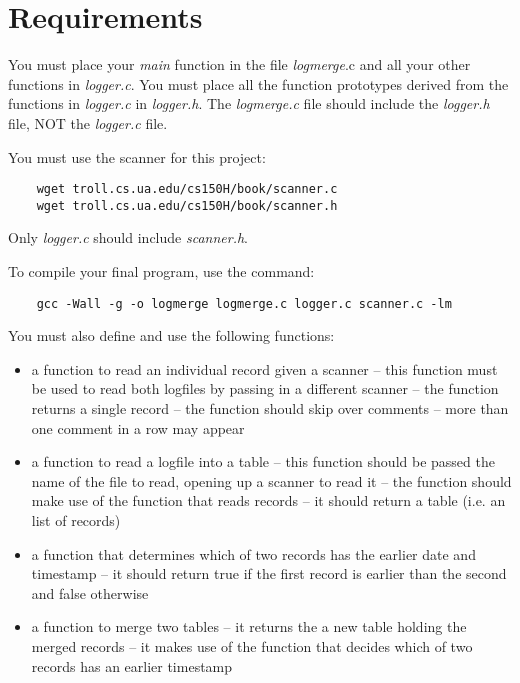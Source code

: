 \documentclass{article}
\begin{document}
\section*{Requirements}

You must place your {\it main} function in the file {\it logmerge}.c
and all your other functions in {\it logger.c}.
You must place all the function
prototypes derived from the functions in {\it logger.c} in {\it logger.h}.
The {\it logmerge.c} file should include the {\it logger.h} file,
NOT the {\it logger.c} file.

You must use the scanner for this project:

\begin{verbatim}
    wget troll.cs.ua.edu/cs150H/book/scanner.c
    wget troll.cs.ua.edu/cs150H/book/scanner.h
\end{verbatim}
    
Only {\it logger.c} should include {\it scanner.h}.

To compile your final program, use the command:

\begin{verbatim}
    gcc -Wall -g -o logmerge logmerge.c logger.c scanner.c -lm
\end{verbatim}

You must also define and use
the following functions:

\begin{itemize}
\item
         a function to read an individual record given a scanner -- this
         function must be used to read both logfiles by passing in
         a different scanner -- the function returns a single record --
         the function should skip over comments -- more than one
         comment in a row may appear

\item
     a function to read a logfile into a table -- this function
     should be passed the name of the file to read, opening up
     a scanner to read it -- the function should make use of
     the function that reads records -- it should return a table
     (i.e. an list of records)

\item
     a function that determines which of two records has the
     earlier date and timestamp -- it should return true if
     the first record is earlier than the second and false otherwise

\item
     a function to merge two tables -- it returns the a new table
     holding the merged records -- it makes use of the function that
     decides which of two records has an earlier timestamp
\end{itemize}
\end{document}
